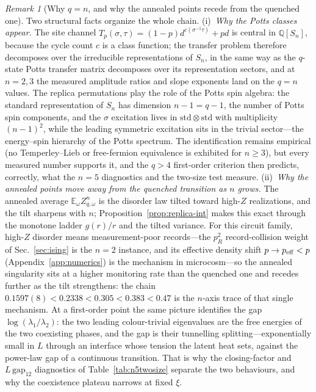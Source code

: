 \documentclass[aps,prx,reprint,superscriptaddress,nobibnotes,longbibliography]{revtex4-2}
\theoremstyle{remark}
\newtheorem{remark}{Remark}
\newcommand{\E}{\mathbb E}
\begin{document}
\begin{remark}[Why $q=n$, and why the annealed points recede from the quenched one]
\label{rem:whyqn}
Two structural facts organize the whole chain.  (i)~\emph{Why the Potts
classes appear.}  The site channel $T_p(\sigma,\tau)=(1-p)d^{c(\sigma^{-1}\tau)}+pd$
is central in $\mathbb Q[S_n]$, because the cycle count $c$ is a class
function; the transfer problem therefore decomposes over the irreducible
representations of $S_n$, in the same way as the $q$-state Potts
transfer matrix decomposes over its representation sectors, and at
$n=2,3$ the measured amplitude ratios and slope exponents land on the
$q=n$ values.  The replica permutations play the role of the Potts spin
algebra: the standard representation of $S_n$ has dimension $n-1=q-1$,
the number of Potts spin components, and the $\sigma$ excitation lives
in $\mathrm{std}\otimes\mathrm{std}$ with multiplicity $(n-1)^2$, while
the leading symmetric excitation sits in the trivial sector---the
energy--spin hierarchy of the Potts spectrum.  The identification
remains empirical (no Temperley--Lieb or free-fermion equivalence is
exhibited for $n\ge3$), but every measured number supports it, and the
$q>4$ first-order criterion then predicts, correctly, what the $n=5$
diagnostics and the two-size test measure.  (ii)~\emph{Why the annealed
points move away from the quenched transition as $n$ grows.}  The
annealed average $\E_\omega Z_{q,\omega}^n$ is the disorder law tilted
toward high-$Z$ realizations, and the tilt sharpens with $n$;
Proposition~\ref{prop:replica-int} makes this exact through the monotone
ladder $g(r)/r$ and the tilted variance.  For this circuit family,
high-$Z$ disorder means measurement-poor records---the $p_R^2$
record-collision weight of Sec.~\ref{sec:ising} is the $n=2$ instance,
and its effective density shift $p\to p_{\rm eff}<p$ (Appendix~\ref{app:numerics})
is the mechanism in microcosm---so the annealed singularity sits at a
higher monitoring rate than the quenched one and recedes further as the
tilt strengthens: the chain
$0.1597(8)<0.2338<0.305<0.383<0.47$ is the $n$-axis trace of that
single mechanism.  At a first-order point the same picture identifies
the gap $\log(\lambda_1/\lambda_2)$: the two leading colour-trivial
eigenvalues are the free energies of the two coexisting phases, and the
gap is their tunnelling splitting---exponentially small in $L$ through
an interface whose tension the latent heat sets, against the power-law
gap of a continuous transition.  That is why the closing-factor and
$L\,\mathrm{gap}_{12}$ diagnostics of Table~\ref{tab:n5twosize}
separate the two behaviours, and why the coexistence plateau narrows at
fixed $\xi$.
\end{remark}
\end{document}
